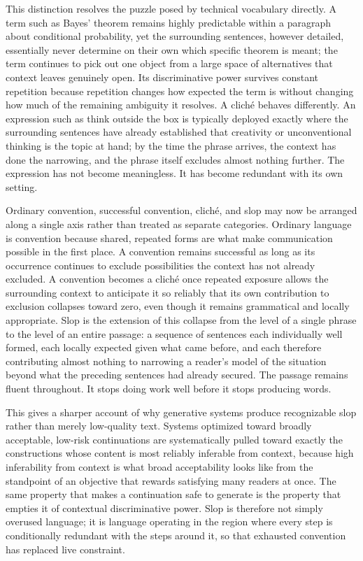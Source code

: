 \documentclass[11pt,oneside]{book}
\theoremstyle{plain}
\theoremstyle{definition}
\theoremstyle{remark}
\begin{document}
This distinction resolves the puzzle posed by technical vocabulary directly. A term such as Bayes' theorem remains highly predictable within a paragraph about conditional probability, yet the surrounding sentences, however detailed, essentially never determine on their own which specific theorem is meant; the term continues to pick out one object from a large space of alternatives that context leaves genuinely open. Its discriminative power survives constant repetition because repetition changes how expected the term is without changing how much of the remaining ambiguity it resolves. A cliché behaves differently. An expression such as think outside the box is typically deployed exactly where the surrounding sentences have already established that creativity or unconventional thinking is the topic at hand; by the time the phrase arrives, the context has done the narrowing, and the phrase itself excludes almost nothing further. The expression has not become meaningless. It has become redundant with its own setting.

Ordinary convention, successful convention, cliché, and slop may now be arranged along a single axis rather than treated as separate categories. Ordinary language is convention because shared, repeated forms are what make communication possible in the first place. A convention remains successful as long as its occurrence continues to exclude possibilities the context has not already excluded. A convention becomes a cliché once repeated exposure allows the surrounding context to anticipate it so reliably that its own contribution to exclusion collapses toward zero, even though it remains grammatical and locally appropriate. Slop is the extension of this collapse from the level of a single phrase to the level of an entire passage: a sequence of sentences each individually well formed, each locally expected given what came before, and each therefore contributing almost nothing to narrowing a reader's model of the situation beyond what the preceding sentences had already secured. The passage remains fluent throughout. It stops doing work well before it stops producing words.

This gives a sharper account of why generative systems produce recognizable slop rather than merely low-quality text. Systems optimized toward broadly acceptable, low-risk continuations are systematically pulled toward exactly the constructions whose content is most reliably inferable from context, because high inferability from context is what broad acceptability looks like from the standpoint of an objective that rewards satisfying many readers at once. The same property that makes a continuation safe to generate is the property that empties it of contextual discriminative power. Slop is therefore not simply overused language; it is language operating in the region where every step is conditionally redundant with the steps around it, so that exhausted convention has replaced live constraint.
\end{document}
